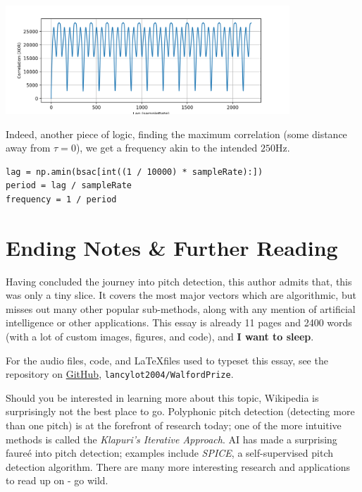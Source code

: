 \documentclass{article}
\begin{document}
\begin{center} \includegraphics[width=0.8\textwidth]{img/bsac_result.png} \end{center}

Indeed, another piece of logic, finding the maximum correlation (some distance away from $\tau = 0$), we get a frequency akin to the intended $250$Hz.

\begin{verbatim}
lag = np.amin(bsac[int((1 / 10000) * sampleRate):])
period = lag / sampleRate
frequency = 1 / period
\end{verbatim}

\section{Ending Notes \& Further Reading}

Having concluded the journey into pitch detection, this author admits that, this was only a tiny slice. It covers the most major vectors which are algorithmic, but misses out many other popular sub-methods, along with any mention of artificial intelligence or other applications. This essay is already 11 pages and 2400 words (with a lot of custom images, figures, and code), and \textbf{I want to sleep}.

For the audio files, code, and \LaTeX files used to typeset this essay, see the repository on \href{https://github.com/lancylot2004/WalfordPrize}{GitHub}, \texttt{lancylot2004/WalfordPrize}. 

Should you be interested in learning more about this topic, Wikipedia is surprisingly not the best place to go. Polyphonic pitch detection (detecting more than one pitch) is at the forefront of research today; one of the more intuitive methods is called the \emph{Klapuri's Iterative Approach}. AI has made a surprising faure\'e into pitch detection; examples include \emph{SPICE}, a self-supervised pitch detection algorithm. There are many more interesting research and applications to read up on - go wild.

\newpage \printbibliography
\end{document}
